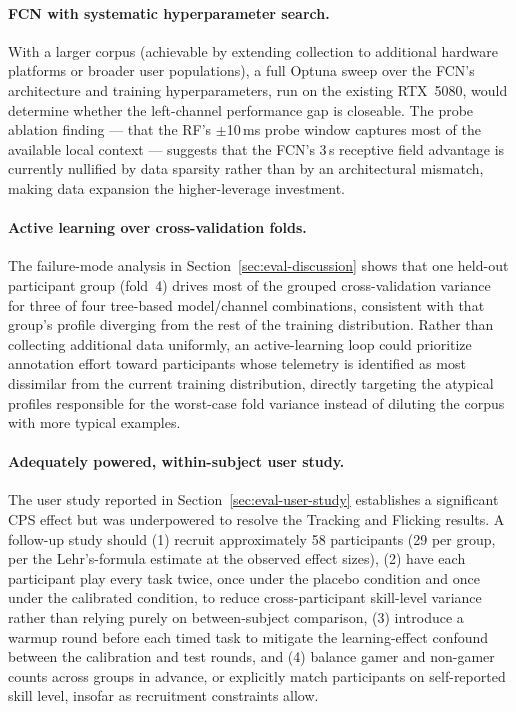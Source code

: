 \paragraph{FCN with systematic hyperparameter search.}
With a larger corpus (achievable by extending collection to additional hardware
platforms or broader user populations), a full Optuna sweep over the FCN's
architecture and training hyperparameters, run on the existing RTX~5080, would
determine whether the left-channel performance gap is closeable. The probe
ablation finding --- that
the RF's $\pm$10\,ms probe window captures most of the available local context ---
suggests that the FCN's 3\,s receptive field advantage is currently nullified by
data sparsity rather than by an architectural mismatch, making data expansion the
higher-leverage investment.

\paragraph{Active learning over cross-validation folds.}
The failure-mode analysis in Section~\ref{sec:eval-discussion} shows that one
held-out participant group (fold~4) drives most of the grouped cross-validation
variance for three of four tree-based model/channel combinations, consistent
with that group's profile diverging from the rest of the training distribution.
Rather than collecting additional data uniformly, an active-learning loop could
prioritize annotation effort toward participants whose telemetry is identified
as most dissimilar from the current training distribution, directly targeting
the atypical profiles responsible for the worst-case fold variance instead of
diluting the corpus with more typical examples.

\paragraph{Adequately powered, within-subject user study.}
The user study reported in Section~\ref{sec:eval-user-study} establishes a
significant CPS effect but was underpowered to resolve the Tracking and Flicking
results. A follow-up study should (1) recruit approximately 58 participants
(29 per group, per the Lehr's-formula estimate at the observed effect sizes),
(2) have each participant play every task twice, once under the placebo condition
and once under the calibrated condition, to reduce cross-participant skill-level
variance rather than relying purely on between-subject comparison, (3) introduce
a warmup round before each timed task to mitigate the learning-effect confound
between the calibration and test rounds, and (4) balance gamer and non-gamer
counts across groups in advance, or explicitly match participants on
self-reported skill level, insofar as recruitment constraints allow.

